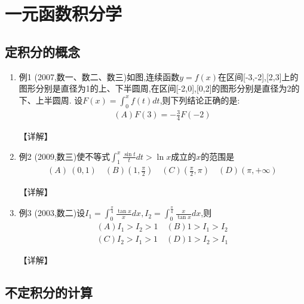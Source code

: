 \documentclass[12pt, a4paper, oneside, UTF8]{ctexbook}
\begin{document}

\else
\fi

\chapter{一元函数积分学}
\section{ 定积分的概念}

\begin{enumerate}[label=\arabic*.]
    \item 例1 (2007,数一、数二、数三)如图,连续函数$y=f(x)$在区间[-3,-2],[2,3]上的图形分别是直径为1的上、下半圆周,在区间[-2,0],[0,2]的图形分别是直径为2的下、上半圆周.
    设$F(x)=\int_0^x f(t) dt$,则下列结论正确的是:
    \begin{align*}
        (A) F(3)=-\frac{3}{4} F(-2)
    \end{align*}
    
    \begin{solution}
    【详解】
    \end{solution}
    
    \item 例2 (2009,数三)使不等式$\int_1^x\frac{\sin t}{t} dt>\ln x$成立的$x$的范围是
    \begin{align*}
        (A)\ (0,1)\quad(B)\left(1,\frac{\pi}{2}\right)\quad(C)\left(\frac{\pi}{2},\pi\right)\quad(D)(\pi,+\infty)
    \end{align*}
    
    \begin{solution}
    【详解】
    \end{solution}
    
    \item 例3 (2003,数二)设$I_1=\int_0^{\frac{\pi}{4}}\frac{\tan x}{x} dx, I_2=\int_0^{\frac{\pi}{4}}\frac{x}{\tan x} dx$,则
    \begin{align*}
        (A) I_1>I_2>1\quad(B) 1>I_1>I_2 \\
        (C) I_2>I_1>1\quad(D) 1>I_2>I_1
    \end{align*}
    
    \begin{solution}
    【详解】
    \end{solution}
\end{enumerate}

\section{ 不定积分的计算}
\end{document}
